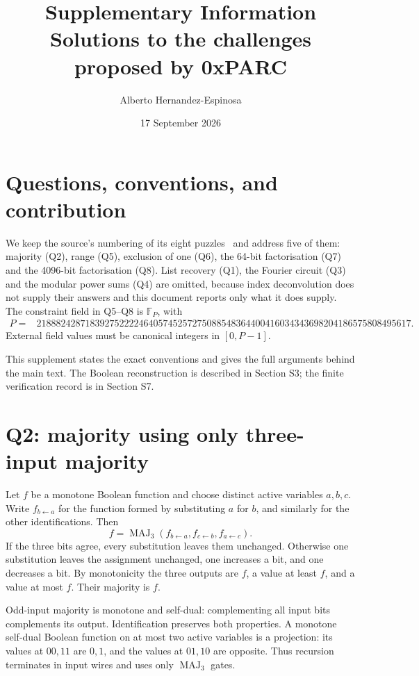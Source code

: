 \documentclass[11pt,a4paper]{article}
\title{Supplementary Information\\[5pt]
\large Solutions to the challenges proposed by 0xPARC}
\author{Alberto Hernandez-Espinosa}
\date{17 September 2026}
\newcommand{\Maj}{\operatorname{MAJ}_3}
\newcommand{\F}{\mathbb F}
\begin{document}
\maketitle
\tableofcontents
\newpage
\section{Questions, conventions, and contribution}
We keep the source's numbering of its eight puzzles~\cite{challenge} and
address five of them: majority (Q2), range (Q5), exclusion of one (Q6), the
64-bit factorisation (Q7) and the 4096-bit factorisation (Q8). List recovery
(Q1), the Fourier circuit (Q3) and the modular power sums (Q4) are omitted,
because index deconvolution does not supply their answers and this document
reports only what it does supply. The constraint field in Q5--Q8 is
$\F_P$, with
\begin{align*}
P={}&21888242871839275222246405745257275088548364400416034343698204186575808495617.
\end{align*}
External field values must be canonical integers in $[0,P-1]$.

This supplement states the exact conventions and gives the full arguments
behind the main text. The Boolean reconstruction is described in Section S3;
the finite verification record is in Section S7.

\section{Q2: majority using only three-input majority}
Let $f$ be a monotone Boolean function and choose distinct active variables
$a,b,c$. Write $f_{b\gets a}$ for the function formed by substituting $a$ for
$b$, and similarly for the other identifications. Then
\[
 f=\Maj(f_{b\gets a},f_{c\gets b},f_{a\gets c}).
\]
If the three bits agree, every substitution leaves them unchanged. Otherwise
one substitution leaves the assignment unchanged, one increases a bit, and
one decreases a bit. By monotonicity the three outputs are $f$, a value at
least $f$, and a value at most $f$. Their majority is $f$.

Odd-input majority is monotone and self-dual: complementing all input bits
complements its output. Identification preserves both properties. A monotone
self-dual Boolean function on at most two active variables is a projection:
its values at $00,11$ are $0,1$, and the values at $01,10$ are opposite.
Thus recursion terminates in input wires and uses only $\Maj$ gates.
\end{document}
